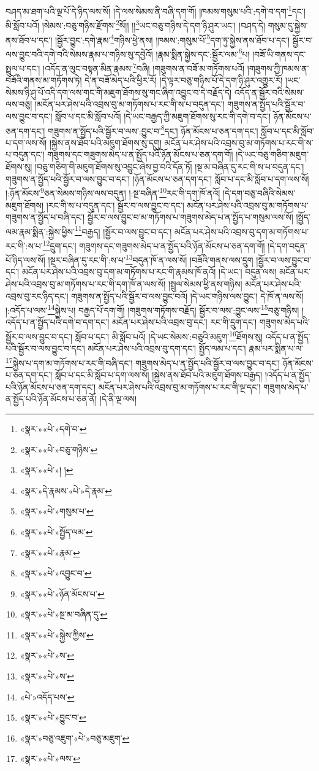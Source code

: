 བཤད་མ་ཐག་པའི་ལྔ་པོ་དེ་ཉིད་ལས་སོ། །དེ་ལས་སེམས་ནི་བཞི་དག་གོ། །ཁམས་གསུམ་པའི་:དགེ་བ་དག་\footnote{«སྣར་»«པེ་»དགེ་བ་}དང་། མི་སློབ་པའོ། །སེམས་:བཅུ་གཉིས་རྫོགས་\footnote{«སྣར་»«པེ་»བཅུ་གཉིས་}སོ།། །།\footnote{«སྣར་»«པེ་»། །}ཡང་བཅུ་གཉིས་དེ་དག་ཉི་ཤུར་ཡང་། །བཤད་དེ། གསུམ་དུ་སྐྱེས་ནས་ཐོབ་པ་དང་། །སྦྱོར་བྱུང་:དགེ་རྣམ་\footnote{«སྣར་»དེ་རྣམས་«པེ་»དེ་རྣམ་}གཉིས་ཕྱེ་ནས། །ཁམས་:གསུམ་པོ་\footnote{«སྣར་»«པེ་»གསུམ་པ་}དག་ཏུ་སྐྱེས་ནས་ཐོབ་པ་དང་། སྦྱོར་བ་ལས་བྱུང་བའི་དགེ་བའི་སེམས་རྣམ་པ་གཉིས་སུ་དབྱེའོ། །རྣམ་སྨིན་སྐྱེས་དང་:སྦྱོར་ལམ་\footnote{«སྣར་»«པེ་»སྤྱོད་ལམ་}པ། །བཟོ་ཡི་གནས་དང་སྤྲུལ་པ་དང་། །འདོད་ན་ལུང་བསྟན་མིན་རྣམས་\footnote{«སྣར་»«པེ་»རྣམ་}བཞི། །གཟུགས་ན་བཟོ་མ་གཏོགས་པའོ། །གཟུགས་ཀྱི་ཁམས་ན་བཟོའི་གནས་མ་གཏོགས་ཏེ། དེ་ན་བཟོ་མེད་པའི་ཕྱིར་རོ། །དེ་ལྟར་བཅུ་གཉིས་པོ་དེ་དག་ཉི་ཤུར་འགྱུར་རོ། །ཡང་སེམས་ཉི་ཤུ་པོ་འདི་དག་ལས་གང་གི་མཇུག་ཐོགས་སུ་གང་ཞིག་འབྱུང་བ་དེ་བརྗོད་དེ། འདོད་ན་སྦྱོར་བའི་སེམས་ལས་བཅུ། །མངོན་པར་ཤེས་པའི་འབྲས་བུ་མ་གཏོགས་པ་རང་གི་ས་པ་བདུན་དང་། གཟུགས་ན་སྤྱོད་པའི་སྦྱོར་བ་ལས་བྱུང་བ་དང་། སློབ་པ་དང་མི་སློབ་པའོ། །དེ་ཡང་བརྒྱད་ཀྱི་མཇུག་ཐོགས་སུ་རང་གི་དགེ་བ་དང་། ཉོན་མོངས་པ་ཅན་དག་དང་། གཟུགས་ན་སྤྱོད་པའི་སྦྱོར་བ་ལས་:བྱུང་བ་\footnote{«སྣར་»«པེ་»འབྱུང་བ་}དང་། ཉོན་མོངས་པ་ཅན་དག་དང་། སློབ་པ་དང་མི་སློབ་པ་དག་ལས་སོ། །སྐྱེས་ནས་ཐོབ་པའི་མཇུག་ཐོགས་སུ་དགུ། མངོན་པར་ཤེས་པའི་འབྲས་བུ་མ་གཏོགས་པ་རང་གི་ས་པ་བདུན་དང་། གཟུགས་དང་གཟུགས་མེད་པ་ན་སྤྱོད་པའི་ཉོན་མོངས་པ་ཅན་དག་གོ། །དེ་ཡང་བཅུ་གཅིག་མཇུག་ཐོགས་སུ། །བཅུ་གཅིག་གི་མཇུག་ཐོགས་སུ་འབྱུང་ཞེས་བྱ་བའི་དོན་ཏོ། །སྔ་མ་བཞིན་དུ་རང་གི་ས་པ་བདུན་དང་། གཟུགས་ན་སྤྱོད་པའི་སྦྱོར་བ་ལས་བྱུང་བ་དང་། །ཉོན་མོངས་པ་ཅན་དག་དང་། སློབ་པ་དང་མི་སློབ་པ་དག་ལས་སོ། །:ཉོན་མོངས་\footnote{«སྣར་»«པེ་»ཉོན་མོངས་པ་}ཅན་སེམས་གཉིས་ལས་བདུན། །:སྔ་བཞིན་\footnote{«སྣར་»«པེ་»སྔ་མ་བཞིན་དུ་}རང་གི་དག་ཁོ་ནའོ། །དེ་དག་བཅུ་བཞིའི་སེམས་མཇུག་ཐོགས། །རང་གི་ས་པ་བདུན་དང་། སྦྱོར་བ་ལས་བྱུང་བ་དང་། མངོན་པར་ཤེས་པའི་འབྲས་བུ་མ་གཏོགས་པ་གཟུགས་ན་སྤྱོད་པ་བཞི་དང་། སྦྱོར་བ་ལས་བྱུང་བ་མ་གཏོགས་པ་གཟུགས་མེད་པ་ན་སྤྱོད་པ་གསུམ་ལས་སོ། །སྤྱོད་ལམ་རྣམ་སྨིན་:སྐྱེས་ཕྱིས་\footnote{«སྣར་»«པེ་»སྐྱེས་ཀྱིས་}བརྒྱད། །སྦྱོར་བ་ལས་བྱུང་བ་དང་། མངོན་པར་ཤེས་པའི་འབྲས་བུ་དག་མ་གཏོགས་པ་རང་གི་:ས་པ་\footnote{«སྣར་»«པེ་»ས་}དྲུག་དང་། གཟུགས་དང་གཟུགས་མེད་པ་ན་སྤྱོད་པའི་ཉོན་མོངས་པ་ཅན་དག་གོ། །དེ་དག་བདུན་པོ་ཉིད་ལས་སོ། །སྔར་བཞིན་དུ་རང་གི་:ས་པ་\footnote{«སྣར་»«པེ་»ས་}བདུན་ཁོ་ན་ལས་སོ། །བཟོའི་གནས་ལས་དྲུག །སྦྱོར་བ་ལས་བྱུང་བ་དང་། མངོན་པར་ཤེས་པའི་འབྲས་བུ་དག་མ་གཏོགས་པ་རང་གི་རྣམས་ཁོ་ནའོ། །དེ་ཡང་། བདུན་ལས། མངོན་པར་ཤེས་པའི་འབྲས་བུ་མ་གཏོགས་པ་རང་གི་དག་ཁོ་ན་ལས་སོ། །སྤྲུལ་སེམས་ཕྱི་ནས་གཉིས། མངོན་པར་ཤེས་པའི་འབྲས་བུ་རང་ཉིད་དང་། གཟུགས་ན་སྤྱོད་པའི་སྦྱོར་བ་ལས་བྱུང་བའོ། །དེ་ཡང་གཉིས་ལས་བྱུང་། དེ་ཁོ་ན་ལས་སོ། །:འདོད་པ་ལས་\footnote{«པེ་»འདོད་པས་}སྐྱེས་པ། བརྒྱད་པོ་དག་གོ། །གཟུགས་གཏོགས་བརྗོད། སྦྱོར་བ་ལས་:བྱུང་ལས་\footnote{«སྣར་»«པེ་»བྱུང་བ་}བཅུ་གཉིས། །འདོད་པ་ན་སྤྱོད་པའི་དགེ་བ་དག་དང་། མངོན་པར་ཤེས་པའི་འབྲས་བུ་དང་། རང་གི་དྲུག་དང་། གཟུགས་མེད་པའི་སྦྱོར་བ་ལས་བྱུང་བ་དང་། སློབ་པ་དང་། མི་སློབ་པའོ། །དེ་ཡང་སེམས་:བཅུའི་མཇུག་\footnote{«སྣར་»བཅུ་འཇུག་«པེ་»བཅུ་མཇུག་}ཐོགས་སུ། འདོད་པ་ན་སྤྱོད་པའི་སྦྱོར་བ་ལས་བྱུང་བ་དང་། མངོན་པར་ཤེས་པའི་འབྲས་བུ་དག་དང་། སྤྱོད་ལམ་པ་དང་། རྣམ་པར་སྨིན་པ་ལ་\footnote{«སྣར་»«པེ་»ལས་}སྐྱེས་པ་དག་མ་གཏོགས་པ་རང་གི་བཞི་དང་། གཟུགས་མེད་པ་ན་སྤྱོད་པའི་སྦྱོར་བ་ལས་བྱུང་བ་དང་། ཉོན་མོངས་པ་ཅན་དག་དང་། སློབ་པ་དང་མི་སློབ་པ་དག་ལས་སོ། །སྐྱེས་ནས་ཐོབ་པའི་མཇུག་ཐོགས་བརྒྱད། །འདོད་པ་ན་སྤྱོད་པའི་ཉོན་མོངས་པ་ཅན་དག་དང་། མངོན་པར་ཤེས་པའི་འབྲས་བུ་མ་གཏོགས་པ་རང་གི་ལྔ་དང་། གཟུགས་མེད་པ་ན་སྤྱོད་པའི་ཉོན་མོངས་པ་ཅན་ནོ། །དེ་ནི་ལྔ་ལས། 